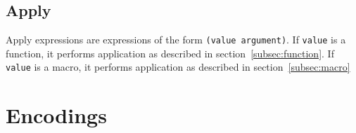 \documentclass{article}
\newcommand{\comm}[1]{}
\begin{document}
\begin{multicols}{\comm{2}}
        \subsection{Apply}\label{subsec:apply}

        \begin{minipage}{\columnwidth}
            Apply expressions are expressions of the form \lstinline{(value argument)}.
            If \texttt{value} is a function, it performs application as described in section~\ref{subsec:function}.
            If \texttt{value} is a macro, it performs application as described in section~\ref{subsec:macro}
        \end{minipage}
    \end{multicols}
    \newpage

    \section{Encodings}\label{sec:encodings}

    \begin{multicols*}{\comm{2}}
        \begin{minipage}{\columnwidth}
            
        \end{minipage}
        \begin{minipage}{\columnwidth}
            
        \end{minipage}
        \begin{minipage}{\columnwidth}
            
        \end{minipage}
        \begin{minipage}{\columnwidth}
            
        \end{minipage}
        \begin{minipage}{\columnwidth}
            
        \end{minipage}
        \begin{minipage}{\columnwidth}
            
        \end{minipage}
        \begin{minipage}{\columnwidth}
            
        \end{minipage}
        \begin{minipage}{\columnwidth}
            
        \end{minipage}
        \begin{minipage}{\columnwidth}
            
        \end{minipage}
    \end{multicols*}
    \newpage
\end{document}
